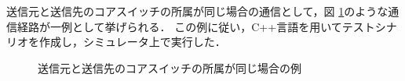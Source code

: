 送信元と送信先のコアスイッチの所属が同じ場合の通信として，図 \ref{fig:4-4}のような通信経路が一例として挙げられる．
この例に従い，C++言語を用いてテストシナリオを作成し，シミュレータ上で実行した．

\begin{figure}[tb]
	\begin{center}
		\caption{送信元と送信先のコアスイッチの所属が同じ場合の例}
		\label{fig:4-4}
	\end{center}
\end{figure}

